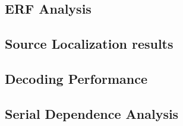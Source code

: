 \documentclass[../main.tex]{subfiles}
\begin{document}
\subsection{ERF Analysis}

\subsection{Source Localization results}

\subsection{Decoding Performance}

\subsection{Serial Dependence Analysis}
\end{document}
